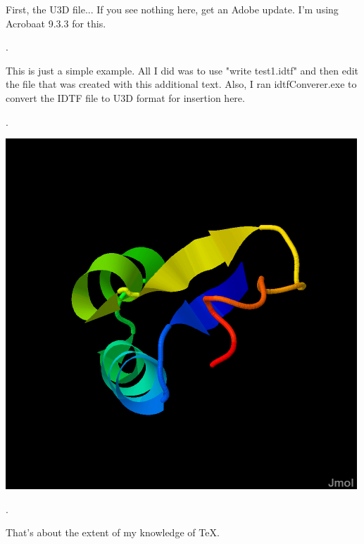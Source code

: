 \documentclass[12pt,letter]{article}
\begin{document}
 \begin{center}

First, the U3D file... If you see nothing here, get an Adobe update. I'm using Acrobaat 9.3.3 for this.


.

This is just a simple example. All I did was to use "write test1.idtf" and then edit the file that was created with this additional text. Also, I ran idtfConverer.exe to convert the IDTF file to U3D format for insertion here.

.

\includegraphics[scale=0.25]{test1.png}

.

That's about the extent of my knowledge of TeX.


\end{center}
\end{document}
